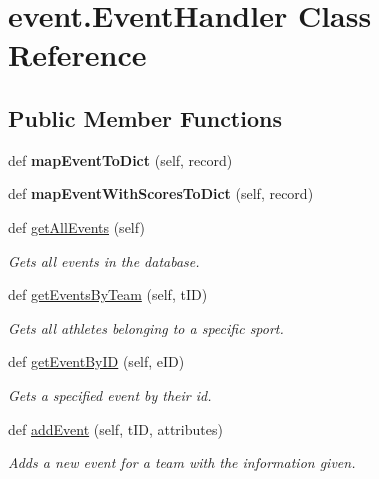 \hypertarget{classevent_1_1_event_handler}{}\section{event.\+Event\+Handler Class Reference}
\label{classevent_1_1_event_handler}
\subsection*{Public Member Functions}
\begin{DoxyCompactItemize}
\item 
\mbox{\label{classevent_1_1_event_handler_a28f26d2a168da859b90dafc4ade48cfb}} 
def {\bfseries map\+Event\+To\+Dict} (self, record)
\item 
\mbox{\label{classevent_1_1_event_handler_a34e504654ee7ab4b3eacddf83c908d40}} 
def {\bfseries map\+Event\+With\+Scores\+To\+Dict} (self, record)
\item 
def \hyperlink{classevent_1_1_event_handler_ac6cc2fd97711012b1d86ca10803baa37}{get\+All\+Events} (self)
\begin{DoxyCompactList}\small\item\em Gets all events in the database. \end{DoxyCompactList}\item 
def \hyperlink{classevent_1_1_event_handler_a1f830364d1554c07f41ace64fe543328}{get\+Events\+By\+Team} (self, t\+ID)
\begin{DoxyCompactList}\small\item\em Gets all athletes belonging to a specific sport. \end{DoxyCompactList}\item 
def \hyperlink{classevent_1_1_event_handler_afcbd5bd749281372de788e6a47f3360a}{get\+Event\+By\+ID} (self, e\+ID)
\begin{DoxyCompactList}\small\item\em Gets a specified event by their id. \end{DoxyCompactList}\item 
def \hyperlink{classevent_1_1_event_handler_a91ff7b7d00a5bcfd7499610163b80ac9}{add\+Event} (self, t\+ID, attributes)
\begin{DoxyCompactList}\small\item\em Adds a new event for a team with the information given. \end{DoxyCompactList}\item 

\end{DoxyCompactItemize}
